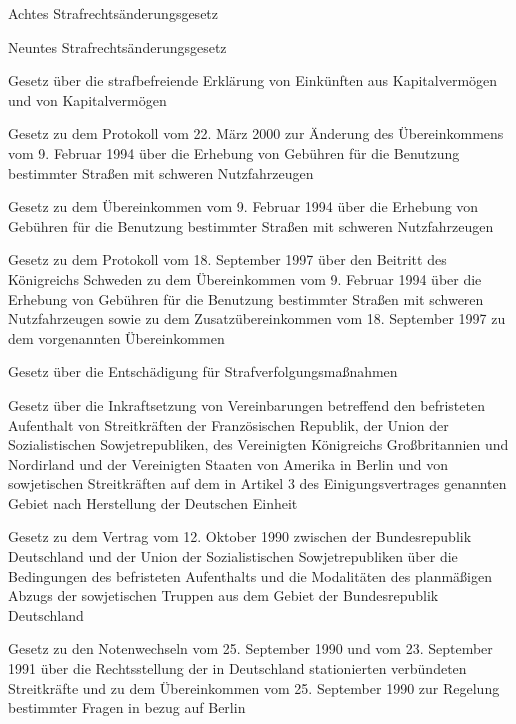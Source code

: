 \item[{StrÄndG-8}] Achtes Strafrechtsänderungsgesetz

\item[{StrÄndG-9}] Neuntes Strafrechtsänderungsgesetz

\item[{StrbEG}] Gesetz über die strafbefreiende Erklärung von Einkünften aus Kapitalvermögen und von Kapitalvermögen

\item[{StrBNÜbkÄndProtG}] Gesetz zu dem Protokoll vom 22. März 2000 zur Änderung des Übereinkommens vom 9. Februar 1994 über die Erhebung von Gebühren für die Benutzung bestimmter Straßen mit schweren Nutzfahrzeugen

\item[{StrBNÜbkG}] Gesetz zu dem Übereinkommen vom 9. Februar 1994 über die Erhebung von Gebühren für die Benutzung bestimmter Straßen mit schweren Nutzfahrzeugen

\item[{StrBNÜbkSEG}] Gesetz zu dem Protokoll vom 18. September 1997 über den Beitritt des Königreichs Schweden zu dem Übereinkommen vom 9. Februar 1994 über die Erhebung von Gebühren für die Benutzung bestimmter Straßen mit schweren Nutzfahrzeugen sowie zu dem Zusatzübereinkommen vom 18. September 1997 zu dem vorgenannten Übereinkommen

\item[{StrEG}] Gesetz über die Entschädigung für Strafverfolgungsmaßnahmen

\item[{StreitkrAVbgInkrG}] Gesetz über die Inkraftsetzung von Vereinbarungen betreffend den befristeten Aufenthalt von Streitkräften der Französischen Republik, der Union der Sozialistischen Sowjetrepubliken, des Vereinigten Königreichs Großbritannien und Nordirland und der Vereinigten Staaten von Amerika in Berlin und von sowjetischen Streitkräften auf dem in Artikel 3 des Einigungsvertrages genannten Gebiet nach Herstellung der Deutschen Einheit

\item[{StreitkrAVtrSUNG}] Gesetz zu dem Vertrag vom 12. Oktober 1990 zwischen der Bundesrepublik Deutschland und der Union der Sozialistischen Sowjetrepubliken über die Bedingungen des befristeten Aufenthalts und die Modalitäten des planmäßigen Abzugs der sowjetischen Truppen aus dem Gebiet der Bundesrepublik Deutschland

\item[{StreitkrNotWG}] Gesetz zu den Notenwechseln vom 25. September 1990 und vom 23. September 1991 über die Rechtsstellung der in Deutschland stationierten verbündeten Streitkräfte und zu dem Übereinkommen vom 25. September 1990 zur Regelung bestimmter Fragen in bezug auf Berlin

